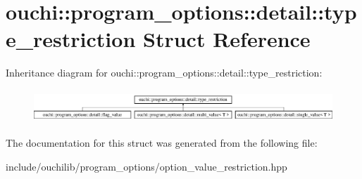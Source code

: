 \hypertarget{structouchi_1_1program__options_1_1detail_1_1type__restriction}{}\section{ouchi\+::program\+\_\+options\+::detail\+::type\+\_\+restriction Struct Reference}
\label{structouchi_1_1program__options_1_1detail_1_1type__restriction}
Inheritance diagram for ouchi\+::program\+\_\+options\+::detail\+::type\+\_\+restriction\+:\begin{figure}[H]
\begin{center}
\leavevmode
\includegraphics[height=1.265537cm]{structouchi_1_1program__options_1_1detail_1_1type__restriction}
\end{center}
\end{figure}


The documentation for this struct was generated from the following file\+:\begin{DoxyCompactItemize}
\item 
include/ouchilib/program\+\_\+options/option\+\_\+value\+\_\+restriction.\+hpp\end{DoxyCompactItemize}
